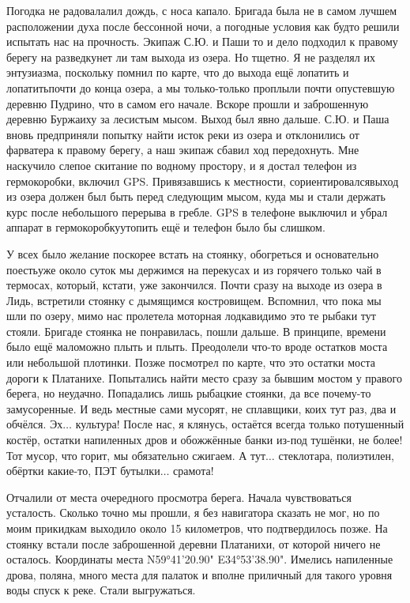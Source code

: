Погодка не радовала\mdash лил дождь, с носа капало. Бригада была не в самом лучшем расположении духа после бессонной ночи, а погодные условия как будто решили испытать нас на прочность. Экипаж С.Ю. и Паши то и дело подходил к правому берегу на разведку\mdash нет ли там выхода из озера. Но тщетно. Я не разделял их энтузиазма, поскольку помнил по карте, что до выхода ещё лопатить и лопатить\mdash почти до конца озера, а мы только-только проплыли почти опустевшую деревню Пудрино, что в самом его начале. Вскоре прошли и заброшенную деревню Буржаиху за лесистым мысом. Выход был явно дальше. С.Ю. и Паша вновь предприняли попытку найти исток реки из озера и отклонились от фарватера к правому берегу, а наш экипаж сбавил ход передохнуть. Мне наскучило слепое скитание по водному простору, и я достал телефон из гермокоробки, включил GPS. Привязавшись к местности, сориентировался\mdash выход из озера должен был быть перед следующим мысом, куда мы и стали держать курс после небольшого перерыва в гребле. GPS в телефоне выключил и убрал аппарат в гермокоробку\mdash утопить ещё и телефон было бы слишком.

У всех было желание поскорее встать на стоянку, обогреться и основательно поесть\mdash уже около суток мы держимся на перекусах и из горячего только чай в термосах, который, кстати, уже закончился. Почти сразу на выходе из озера в Лидь, встретили стоянку с дымящимся костровищем. Вспомнил, что пока мы шли по озеру, мимо нас пролетела моторная лодка\mdash видимо это те рыбаки тут стояли. Бригаде стоянка не понравилась, пошли дальше. В принципе, времени было ещё мало\mdash можно плыть и плыть. Преодолели что-то вроде остатков моста или небольшой плотинки. Позже посмотрел по карте, что это остатки моста дороги к Платанихе. Попытались найти место сразу за бывшим мостом у правого берега, но неудачно. Попадались лишь рыбацкие стоянки, да все почему-то замусоренные. И ведь местные сами мусорят, не сплавщики, коих тут раз, два и обчёлся. Эх$\ldots$ культура! После нас, я клянусь, остаётся всегда только потушенный костёр, остатки напиленных дров и обожжённые банки из-под тушёнки, не более! Тот мусор, что горит, мы обязательно сжигаем. А тут$\ldots$ стеклотара, полиэтилен, обёртки какие-то, ПЭТ бутылки$\ldots$ срамота! 

Отчалили от места очередного просмотра берега. Начала чувствоваться усталость. Сколько точно мы прошли, я без навигатора сказать не мог, но по моим прикидкам выходило около 15 километров, что подтвердилось позже. На стоянку встали после заброшенной деревни Платанихи, от которой ничего не осталось. Координаты места N59°41'20.90" E34°53'38.90". Имелись напиленные дрова, поляна, много места для палаток и вполне приличный для такого уровня воды спуск к реке. Стали выгружаться. 


